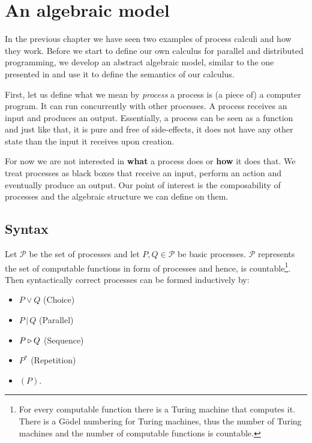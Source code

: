 \chapter{An algebraic model}
\label{chp:algebraic_model}
In the previous chapter we have seen two examples of process calculi and how they work. Before we start to define our own calculus for parallel and distributed programming, we develop an abstract algebraic model, similar to the one presented in \cite{Hoare:2012:LPU:2368298.2368301} and use it to define the semantics of our calculus.

First, let us define what we mean by \textit{process} a process is (a piece of) a computer program. It can run concurrently with other processes. A process receives an input and produces an output. Essentially, a process can be seen as a function and just like that, it is pure and free of side-effects, it does not have any other state than the input it receives upon creation.

For now we are not interested in \textbf{what} a process does or \textbf{how} it does that. We treat processes as black boxes that receive an input, perform an action and eventually produce an output. Our point of interest is the composability of processes and the algebraic structure we can define on them.

\section{Syntax}
\label{chp:syntax}
Let $\mathcal{P}$ be the set of processes and let $P, Q \in \mathcal{P}$ be basic processes. $\mathcal{P}$ represents the set of computable functions in form of processes and hence, is countable\footnote{For every computable function there is a Turing machine that computes it. There is a Gödel numbering for Turing machines, thus the number of Turing machines and the number of computable functions is countable.}. Then syntactically correct processes can be formed inductively by:
\begin{itemize}
  \item $P \vee Q$ \hspace*{2em} (Choice)
  \vspace*{-0.4em}
  \item $P \,|\, Q$ \hspace*{2.5em} (Parallel)
  \vspace*{-0.4em}
  \item $P \triangleright Q$ \hspace*{2.2em} (Sequence)
  \vspace*{-0.4em}
  \item $P^*$ \hspace*{3.5em} (Repetition)
  \vspace*{-0.4em}
  \item $\left( P \right)$.
\end{itemize}

